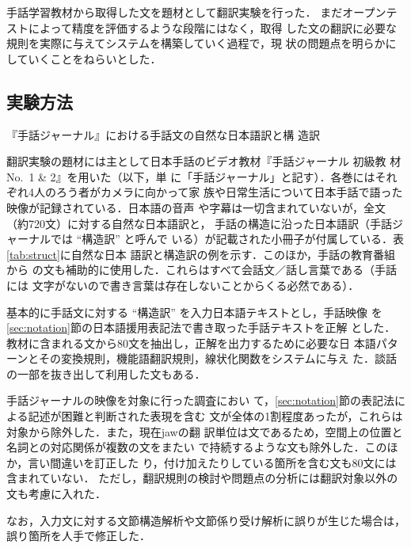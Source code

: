 \documentclass[japanese]{jnlp_1.4}
\begin{document}
手話学習教材から取得した文を題材として翻訳実験を行った．
まだオープンテストによって精度を評価するような段階にはなく，取得
した文の翻訳に必要な規則を実際に与えてシステムを構築していく過程で，現
状の問題点を明らかにしていくことをねらいとした．



\subsection{実験方法}

\begin{table}[b]
  \caption{『手話ジャーナル』における手話文の自然な日本語訳と構
    造訳}
  \label{tab:struct}
  \centering

\end{table}

翻訳実験の題材には主として日本手話のビデオ教材『手話ジャーナル 初級教
材No.~1 \& 2』\cite{SignFactory1997,SignFactory1999}を用いた（以下，単
に「手話ジャーナル」と記す）．各巻にはそれぞれ4人のろう者がカメラに向かって家
族や日常生活について日本手話で語った映像が記録されている．日本語の音声
や字幕は一切含まれていないが，全文（約720文）に対する自然な日本語訳と，
手話の構造に沿った日本語訳（手話ジャーナルでは ``構造訳'' と呼んで
いる）が記載された小冊子が付属している．表\ref{tab:struct}に自然な日本
語訳と構造訳の例を示す．このほか，手話の教育番組\cite{Yonekawa2006}から
の文も補助的に使用した．これらはすべて会話文／話し言葉である（手話には
文字がないので書き言葉は存在しないことからくる必然である）．

基本的に手話文に対する ``構造訳'' を入力日本語テキストとし，手話映像
を\ref{sec:notation}節の日本語援用表記法で書き取った手話テキストを正解
とした．教材に含まれる文から80文を抽出し，正解を出力するために必要な日
本語パターンとその変換規則，機能語翻訳規則，線状化関数をシステムに与え
た．談話の一部を抜き出して利用した文もある．

手話ジャーナルの映像を対象に行った調査\cite{Matsumoto2006}におい
て，\ref{sec:notation}節の表記法による記述が困難と判断された表現を含む
文が全体の1割程度あったが，これらは対象から除外した．また，現在jawの翻
訳単位は文であるため，空間上の位置と名詞との対応関係が複数の文をまたい
で持続するような文も除外した．このほか，言い間違いを訂正した
り，付け加えたりしている箇所を含む文も80文には含まれていない．
ただし，翻訳規則の検討や問題点の分析には翻訳対象以外の文も考慮に入れた．

なお，入力文に対する文節構造解析や文節係り受け解析に誤りが生じた場合は，
誤り箇所を人手で修正した．
\end{document}
